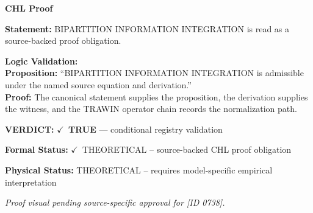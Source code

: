 \vspace{0.45em}
\noindent\textbf{CHL Proof}\par
\textbf{Statement:} BIPARTITION INFORMATION INTEGRATION is read as a source-backed proof obligation.

\textbf{Logic Validation:}\\
\textbf{Proposition:} ``BIPARTITION INFORMATION INTEGRATION is admissible under the named source equation and derivation.''\\
\textbf{Proof:} The canonical statement supplies the proposition, the derivation supplies the witness, and the TRAWIN operator chain records the normalization path.

\textbf{VERDICT:} \ensuremath{\checkmark}\ \textbf{TRUE} --- conditional registry validation

\textbf{Formal Status:} \ensuremath{\checkmark}\ THEORETICAL -- source-backed CHL proof obligation

\textbf{Physical Status:} THEORETICAL -- requires model-specific empirical interpretation
\par\vspace{0.45em}
\par
\vfill
\begingroup\footnotesize\itshape
Proof visual pending source-specific approval for [ID 0738].
\par\endgroup
\vfill
\endgroup
\endgroup
